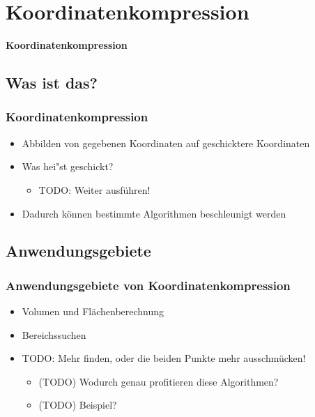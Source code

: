 \section{Koordinatenkompression}
\begin{frame}
	\begin{center}
		\textbf{Koordinatenkompression}
	\end{center}
\end{frame}

\subsection{Was ist das?}
\begin{frame}
	\frametitle{{Koordinatenkompression}}
	\begin{itemize}
		\item Abbilden von gegebenen Koordinaten auf geschicktere Koordinaten
		\pause
		\item Was hei"st geschickt?
		\pause
		\begin{itemize}
			\item TODO: Weiter ausf\"uhren!
		\end{itemize}
		\pause
		\item Dadurch k\"onnen bestimmte Algorithmen beschleunigt werden
	\end{itemize}
\end{frame}

\subsection{Anwendungsgebiete}
\begin{frame}
	\frametitle{{Anwendungsgebiete von Koordinatenkompression}}
	\begin{itemize}
		\item Volumen und Fl\"achenberechnung
		\pause
		\item Bereichssuchen
		\pause
		\item TODO: Mehr finden, oder die beiden Punkte mehr ausschmücken!
		\begin{itemize}
			\item (TODO) Wodurch genau profitieren diese Algorithmen?
			\item (TODO) Beispiel?
		\end{itemize}
	\end{itemize}
\end{frame}